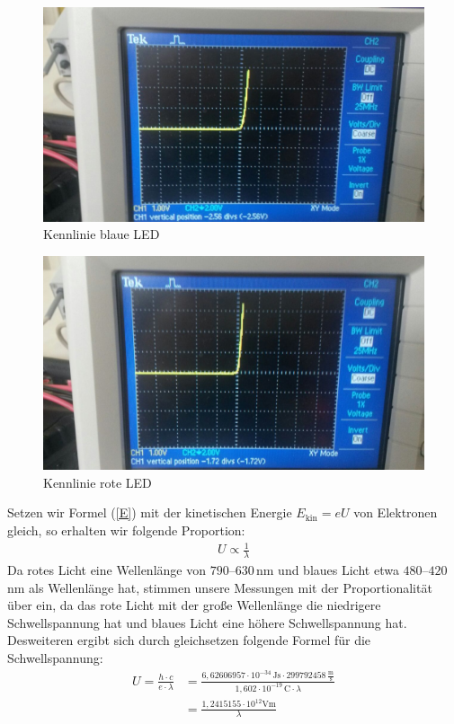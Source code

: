 \documentclass[fontsize=12pt]{scrartcl}
\begin{document}
\begin{figure}[H]
\centering
\includegraphics[scale=0.2]{Graphik/blau1}
\caption{Kennlinie blaue LED}
\end{figure}
\noindent
\begin{figure}[H]
\vspace{-20pt}
\centering
\includegraphics[scale=0.2]{Graphik/rot1}
\caption{Kennlinie rote LED}
\end{figure}
\noindent
Setzen wir Formel (\ref{E}) mit der kinetischen Energie $E_{\text{kin}}=eU$ von Elektronen gleich, so erhalten wir folgende Proportion:
\begin{align*}
U \propto \frac{1}{\lambda}
\end{align*}
Da rotes Licht eine Wellenlänge von  $790–630$\,nm und blaues Licht etwa $480–420$\,nm als Wellenlänge hat, stimmen unsere Messungen mit der Proportionalität über ein, da das rote Licht mit der große Wellenlänge die niedrigere Schwellspannung hat und blaues Licht eine höhere Schwellspannung hat.
\newpage
\noindent
Desweiteren ergibt sich durch gleichsetzen folgende Formel für die Schwellspannung:
\begin{align*}
U=\frac{h\cdot c}{e\cdot \lambda} &=\frac{6,626 069 57 \cdot 10^{-34}\,\text{Js} \cdot 299792458\,\frac{\text{m}}{\text{s}}}
{1,602\cdot 10^{-19}\,\text{C}\cdot \lambda}\\
&=\frac{1,2415155\cdot 10^{12}\text{Vm}}{\lambda}
\end{align*}
\end{document}
